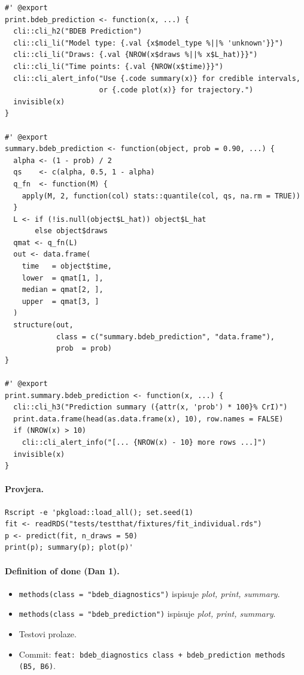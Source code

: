 \documentclass[11pt,a4paper]{article}
\newcommand{\code}[1]{\texttt{\small #1}}
\begin{document}
\begin{lstlisting}
#' @export
print.bdeb_prediction <- function(x, ...) {
  cli::cli_h2("BDEB Prediction")
  cli::cli_li("Model type: {.val {x$model_type %||% 'unknown'}}")
  cli::cli_li("Draws: {.val {NROW(x$draws %||% x$L_hat)}}")
  cli::cli_li("Time points: {.val {NROW(x$time)}}")
  cli::cli_alert_info("Use {.code summary(x)} for credible intervals,
                      or {.code plot(x)} for trajectory.")
  invisible(x)
}

#' @export
summary.bdeb_prediction <- function(object, prob = 0.90, ...) {
  alpha <- (1 - prob) / 2
  qs    <- c(alpha, 0.5, 1 - alpha)
  q_fn  <- function(M) {
    apply(M, 2, function(col) stats::quantile(col, qs, na.rm = TRUE))
  }
  L <- if (!is.null(object$L_hat)) object$L_hat
       else object$draws
  qmat <- q_fn(L)
  out <- data.frame(
    time   = object$time,
    lower  = qmat[1, ],
    median = qmat[2, ],
    upper  = qmat[3, ]
  )
  structure(out,
            class = c("summary.bdeb_prediction", "data.frame"),
            prob  = prob)
}

#' @export
print.summary.bdeb_prediction <- function(x, ...) {
  cli::cli_h3("Prediction summary ({attr(x, 'prob') * 100}% CrI)")
  print.data.frame(head(as.data.frame(x), 10), row.names = FALSE)
  if (NROW(x) > 10)
    cli::cli_alert_info("[... {NROW(x) - 10} more rows ...]")
  invisible(x)
}
\end{lstlisting}

\paragraph{Provjera.}
\begin{lstlisting}[style=Shellstyle]
Rscript -e 'pkgload::load_all(); set.seed(1)
fit <- readRDS("tests/testthat/fixtures/fit_individual.rds")
p <- predict(fit, n_draws = 50)
print(p); summary(p); plot(p)'
\end{lstlisting}

\paragraph{Definition of done (Dan 1).}
\begin{itemize}[leftmargin=1.4em,nosep]
  \item \code{methods(class = "bdeb\_diagnostics")} ispisuje
    \emph{plot, print, summary}.
  \item \code{methods(class = "bdeb\_prediction")} ispisuje
    \emph{plot, print, summary}.
  \item Testovi prolaze.
  \item Commit: \code{feat: bdeb\_diagnostics class + bdeb\_prediction
    methods (B5, B6)}.
\end{itemize}
\end{document}
